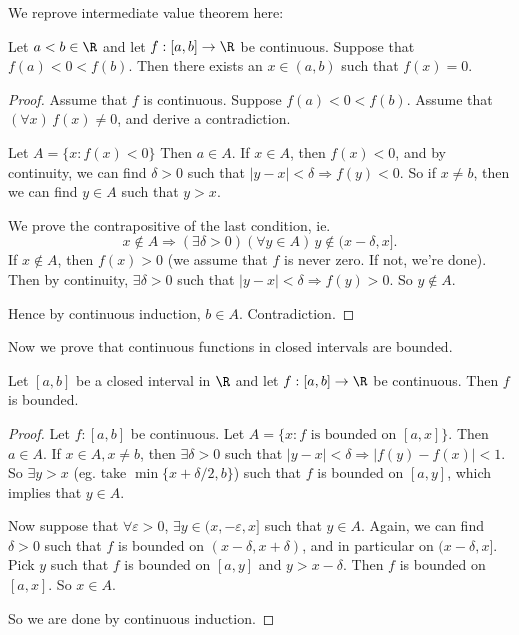 \documentclass[a4paper]{article}
\begin{document}
We reprove intermediate value theorem here:

\begin{thm}
  Let $a < b\in \R$ and let $f: [a, b] \to \R$ be continuous. Suppose that $f(a) < 0 < f(b)$. Then there exists an $x\in (a, b)$ such that $f(x) = 0$.
\end{thm}

\begin{proof}
  Assume that $f$ is continuous. Suppose $f(a) < 0 < f(b)$. Assume that $(\forall x)\, f(x) \not =0$, and derive a contradiction.

  Let $A = \{x: f(x) < 0\}$ Then $a\in A$. If $x\in A$, then $f(x) < 0$, and by continuity, we can find $\delta > 0$ such that $|y - x| < \delta\Rightarrow f(y) < 0$. So if $x\not= b$, then we can find $y\in A$ such that $y > x$.

  We prove the contrapositive of the last condition, ie.
  \[
    x\not\in A\Rightarrow (\exists \delta > 0)(\forall y\in A)\, y\not\in(x - \delta, x].
  \]
  If $x\not\in A$, then $f(x) > 0$ (we assume that $f$ is never zero. If not, we're done). Then by continuity, $\exists \delta > 0$ such that $|y - x| < \delta \Rightarrow f(y) > 0$. So $y\not\in A$.

  Hence by continuous induction, $b\in A$. Contradiction.
\end{proof}

Now we prove that continuous functions in closed intervals are bounded.
\begin{thm}
  Let $[a, b]$ be a closed interval in $\R$ and let $f: [a, b] \to \R$ be continuous. Then $f$ is bounded.
\end{thm}

\begin{proof}
  Let $f: [a, b]$ be continuous. Let $A = \{x: f\text{ is bounded on }[a, x]\}$. Then $a\in A$. If $x\in A, x\not= b$, then $\exists \delta > 0$ such that $|y - x| < \delta \Rightarrow |f(y) - f(x)| < 1$. So $\exists y > x$ (eg. take $\min\{x + \delta/2, b\}$) such that $f$ is bounded on $[a, y]$, which implies that $y\in A$.

  Now suppose that $\forall \varepsilon > 0$, $\exists y\in (x, - \varepsilon, x]$ such that $y\in A$. Again, we can find $\delta > 0$ such that $f$ is bounded on $(x - \delta, x + \delta)$, and in particular on $(x - \delta, x]$. Pick $y$ such that $f$ is bounded on $[a, y]$ and $y > x - \delta$. Then $f$ is bounded on $[a, x]$. So $x\in A$.

  So we are done by continuous induction.
\end{proof}
\end{document}
